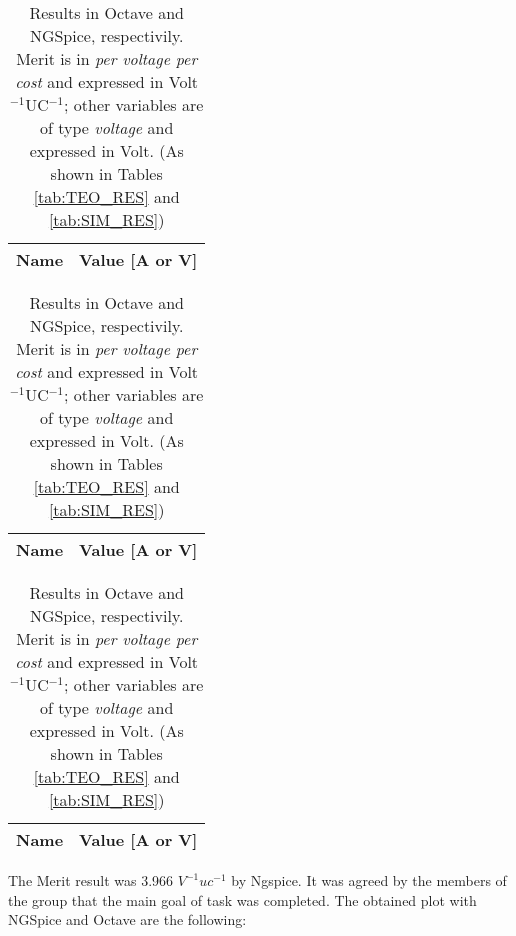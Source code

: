 \begin{table}[h]
\centering
\begin{minipage}[t]{0.33\linewidth}
 	 \begin{tabular}[t]{|l|r|}
 	   \hline    
 	   {\bf Name} & {\bf Value [A or V]} \\ \hline
 	   
 	 \end{tabular}
 	 \label{tab:TEO_CONCLUSAO}
\end{minipage}
\begin{minipage}[t]{0.33\linewidth}
  		\begin{tabular}[t]{|l|r|}
    	\hline    
   		{\bf Name} & {\bf Value [A or V]} \\ \hline
    	
  		\end{tabular}
  	\label{tab:SIM_CONCLUSAO}
\end{minipage}

\begin{minipage}[t]{0.33\linewidth}
  		\begin{tabular}[t]{|l|r|}
    	\hline    
   		{\bf Name} & {\bf Value [A or V]} \\ \hline
    	
  		\end{tabular}
  	\label{tab:SIM_CONCLUSAO}
\end{minipage}
  	\caption{Results in Octave and NGSpice, respectivily. Merit is in {\it per voltage per cost} and expressed in Volt$^{-1}$UC$^{-1}$; other variables are of type {\it voltage} and expressed in Volt. (As shown in Tables \ref{tab:TEO_RES} and \ref{tab:SIM_RES})}
  	\label{tab:CONCLUSAO}
\end{table}

The Merit result was 3.966 $V^{-1}uc^{-1}$ by Ngspice. It was agreed by the members of the group that the main goal of task was completed.
\newpage
The obtained plot with NGSpice and Octave are the following:
